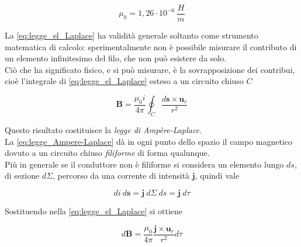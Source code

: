 \begin{tcolorbox}[colback=yellow!10!white, colframe=orange!70!black, boxrule=0.8pt]
\begin{equation}
    \mu_0 = 1,26 \cdot 10^{-6} \ \frac{H}{m}
\end{equation}
\end{tcolorbox}

La \ref{eq:legge_el_Laplace} ha validità generale soltanto come strumento matematica di calcolo: sperimentalmente non è possibile misurare il contributo di un elemento infinitesimo del filo, che non può esistere da solo. \\

Ciò che ha significato fisico, e si può misurare, è la sovrapposizione dei contribui, cioè l'integrale di \ref{eq:legge_el_Laplace} esteso a un circuito chiuso $C$

\begin{tcolorbox}[colback=yellow!10!white, colframe=orange!70!black, boxrule=0.8pt]
\begin{equation}\label{eq:legge_Ampere-Laplace}
    \mathbf{B} = \frac{\mu_0 i}{4 \pi} \oint_C \frac{d\mathbf{s} \times \mathbf{u}_r}{r^2}
\end{equation}
\end{tcolorbox}

Questo risultato costituisce la \emph{legge di Ampère-Laplace}. \\

La \ref{eq:legge_Ampere-Laplace} dà in ogni punto dello spazio il campo magnetico dovuto a un circuito chiuso \emph{filiforme} di forma qualunque. \\

Più in generale se il conduttore non è filiforme si considera un elemento lungo $d s$, di sezione $d \Sigma$, percorso da una corrente di intensità $\mathbf{j}$, quindi vale

\begin{equation*}
    d i \ d\mathbf{s} = \mathbf{j} \ d\Sigma \ ds = \mathbf{j} \  d \tau
\end{equation*}

Sostituendo nella \ref{eq:legge_el_Laplace} si ottiene 

\begin{tcolorbox}[colback=yellow!10!white, colframe=orange!70!black, boxrule=0.8pt]
\begin{equation}
    d\mathbf{B} = \frac{\mu_0 }{4 \pi} \frac{\mathbf{j} \times \mathbf{u}_r}{r^2} d\tau
\end{equation}
\end{tcolorbox}

